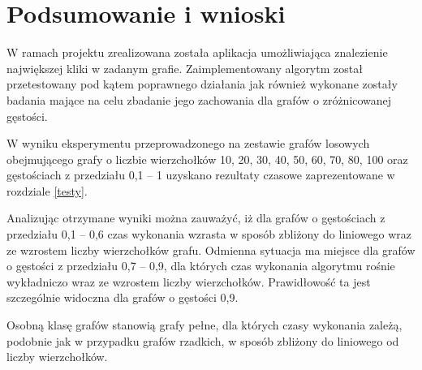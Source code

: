 \documentclass[12pt, a4paper]{article}
\begin{document}
\section{Podsumowanie i wnioski}
W ramach projektu zrealizowana została aplikacja umożliwiająca znalezienie największej kliki w zadanym grafie. 
Zaimplementowany algorytm został przetestowany pod kątem poprawnego działania jak również wykonane 
zostały badania mające na celu zbadanie jego zachowania dla grafów o zróżnicowanej gęstości.

W wyniku eksperymentu przeprowadzonego na zestawie grafów losowych obejmującego grafy o liczbie wierzchołków 
10, 20, 30, 40, 50, 60, 70, 80, 100 oraz gęstościach z przedziału 0,1 -- 1 uzyskano rezultaty czasowe zaprezentowane w rozdziale \ref{testy}.

Analizując otrzymane wyniki można zauważyć, iż dla grafów o gęstościach z przedziału 0,1 -- 0,6 czas wykonania
wzrasta w sposób zbliżony do liniowego wraz ze wzrostem liczby wierzchołków grafu. 
Odmienna sytuacja ma miejsce dla grafów o gęstości z przedziału 0,7 -- 0,9, dla których czas wykonania 
algorytmu rośnie wykładniczo wraz ze wzrostem liczby wierzchołków. 
Prawidłowość ta jest szczególnie widoczna dla grafów o gęstości 0,9. 

Osobną klasę grafów stanowią grafy pełne, dla których czasy wykonania zależą, podobnie jak w przypadku grafów rzadkich, 
w sposób zbliżony do liniowego od liczby wierzchołków.
\end{document}
